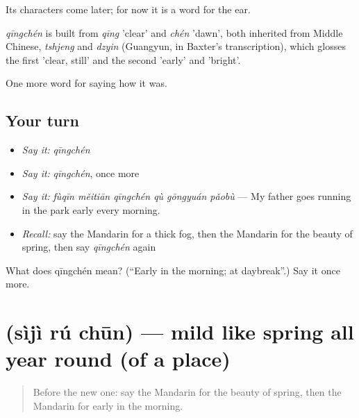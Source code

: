 Its characters come later; for now it is a word for the ear.

\begin{cousinweb}
\emph{qīngchén} is built from \emph{qīng} 'clear' and \emph{chén} 'dawn', both inherited from Middle Chinese, \emph{tshjeng} and \emph{dzyin} (Guangyun, in Baxter's transcription), which glosses the first 'clear, still' and the second 'early' and 'bright'.
\end{cousinweb}

\begin{grammarlens}[title={What you've built}]
One more word for saying how it was.
\end{grammarlens}

\subsection*{Your turn}
\begin{itemize}
\raggedright
  \item \emph{Say it:} \emph{qīngchén}
  \item \emph{Say it:} \emph{qīngchén}, once more
  \item \emph{Say it:} \emph{fùqīn měitiān qīngchén qù gōngyuán pǎobù} — My father goes running in the park early every morning.
  \item \emph{Recall:} say the Mandarin for a thick fog, then the Mandarin for the beauty of spring, then say \emph{qīngchén} again
\end{itemize}

\begin{tcolorbox}[breakable,colback=teal!4,colframe=teal!35!black,title={Before you move on}]
What does qīngchén mean? (\textquotedblleft{}Early in the morning; at daybreak\textquotedblright{}.) Say it once more.
\end{tcolorbox}
\section[\texorpdfstring{\zh{四季如春} (sìjì rú chūn)}{四季如春 (sìjì rú chūn)}]{ (sìjì rú chūn) — mild like spring all year round (of a place)}

\label{lesson:ZH-C519-sijiruchun}



\begin{quote}
Before the new one: say the Mandarin for the beauty of spring, then the Mandarin for early in the morning.
\end{quote}


